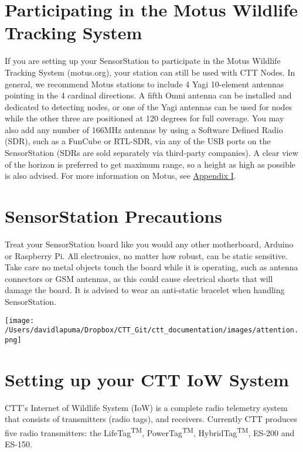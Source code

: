 \documentclass[
]{article}
\begin{document}
\hypertarget{participating-in-the-motus-wildlife-tracking-system}{%
\section{Participating in the Motus Wildlife Tracking
System}\label{participating-in-the-motus-wildlife-tracking-system}}

If you are setting up your SensorStation to participate in the Motus
Wildlife Tracking System (motus.org), your station can still be used
with CTT Nodes. In general, we recommend Motus stations to include 4
Yagi 10-element antennas pointing in the 4 cardinal directions. A fifth
Omni antenna can be installed and dedicated to detecting nodes, or one
of the Yagi antennas can be used for nodes while the other three are
positioned at 120 degrees for full coverage. You may also add any number
of 166MHz antennas by using a Software Defined Radio (SDR), such as a
FunCube or RTL-SDR, via any of the USB ports on the SensorStation (SDRs
are sold separately via third-party companies). A clear view of the
horizon is preferred to get maximum range, so a height as high as
possible is also advised. For more information on Motus, see
\protect\hyperlink{appendix_1}{Appendix I}.

\hypertarget{sensorstation-precautions}{%
\section{SensorStation Precautions}\label{sensorstation-precautions}}

Treat your SensorStation board like you would any other motherboard,
Arduino or Raspberry Pi. All electronics, no matter how robust, can be
static sensitive. Take care no metal objects touch the board while it is
operating, such as antenna connectors or GSM antennas, as this could
cause electrical shorts that will damage the board. It is advised to
wear an anti-static bracelet when handling SensorStation.

\texttt{[image: /Users/davidlapuma/Dropbox/CTT\_Git/ctt\_documentation/images/attention.png]}

\hypertarget{setting-up-your-ctt-iow-system}{%
\section{Setting up your CTT IoW
System}\label{setting-up-your-ctt-iow-system}}

CTT's Internet of Wildlife System (IoW) is a complete radio telemetry
system that consists of transmitters (radio tags), and receivers.
Currently CTT produces five radio transmitters: the
LifeTag\textsuperscript{TM}, PowerTag\textsuperscript{TM},
HybridTag\textsuperscript{TM}, ES-200 and ES-150.
\end{document}
